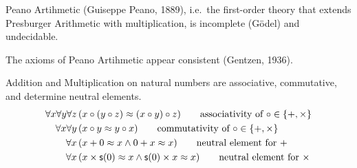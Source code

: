 \begin{theorem}Peano Artihmetic (Guiseppe Peano, 1889), 
	i.e.~the first-order theory that extends Presburger Arithmetic with multiplication, is incomplete (Gödel) and undecidable. 
\end{theorem}

\begin{theorem}
	The axioms of Peano Artihmetic appear consistent (Gentzen, 1936).
\end{theorem}

\begin{lemma}[ACN]\label{lem:acn}
	Addition and Multiplication on natural numbers are associative, commutative, 
	and determine neutral elements.
	\begin{align*}
	\forall x\forall y\forall z\,&(x\circ(y\circ z) \mEQ (x\circ y)\circ z) 
	\tag*{associativity of $\circ\in\{+,\times\}$}
	\\
	\forall x\forall y\,&(x\circ y \mEQ y\circ x)
	\tag*{commutativity of $\circ\in\{+,\times\}$}
	\\
	\forall x\,&(x + 0\mEQ x \land 0 + x \mEQ x )
	\tag*{neutral element for $+$}
	\\
	\forall x\,&(x \times \msucc(0)\mEQ x \land \msucc(0) \times x \mEQ x )
	\tag*{neutral element for $\times$}
	\end{align*}
\end{lemma}











